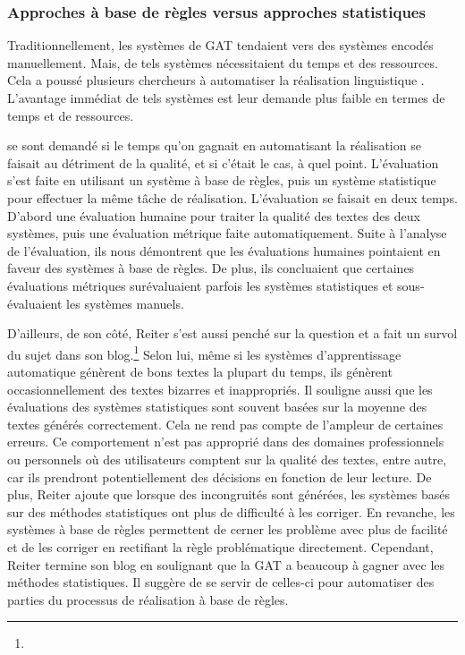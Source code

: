 \subsubsection{Approches à base de règles versus approches statistiques}


Traditionnellement, les systèmes de \ac{GAT} tendaient vers des systèmes encodés manuellement. Mais, de tels systèmes nécessitaient du temps et des ressources. Cela a poussé plusieurs chercheurs à automatiser la réalisation linguistique \citep{LangkildeForestbasedStatisticalSentence2000}. L'avantage immédiat de tels systèmes est leur demande plus faible en termes de temps et de ressources. 

\cite{BelzSystemBuildingCost2009} se sont demandé si le temps qu'on gagnait en automatisant la réalisation se faisait au détriment de la qualité, et si c'était le cas, à quel point. L'évaluation s'est faite en utilisant un système à base de règles, puis un système statistique pour effectuer la même tâche de réalisation. L'évaluation se faisait en deux temps. D'abord une évaluation humaine pour traiter la qualité des textes des deux systèmes, puis une évaluation métrique faite automatiquement. Suite à l'analyse de l'évaluation, ils nous démontrent que les évaluations humaines pointaient en faveur des systèmes à base de règles. De plus, ils concluaient que certaines évaluations métriques surévaluaient parfois les systèmes statistiques et sous-évaluaient les systèmes manuels.

D'ailleurs, de son côté, Reiter s'est aussi penché sur la question et a fait un survol du sujet dans son blog.\footnote{} Selon lui, même si les systèmes d'apprentissage automatique génèrent de bons textes la plupart du temps, ils génèrent occasionnellement des textes bizarres et inappropriés. Il souligne aussi que les évaluations des systèmes statistiques sont souvent basées sur la moyenne des textes générés correctement. Cela ne rend pas compte de l'ampleur de certaines erreurs. Ce comportement n'est pas approprié dans des domaines professionnels ou personnels où des utilisateurs comptent sur la qualité des textes, entre autre, car ils prendront potentiellement des décisions en fonction de leur lecture. De plus, Reiter ajoute que lorsque des incongruités sont générées, les systèmes basés sur des méthodes statistiques ont plus de difficulté à les corriger. En revanche, les systèmes à base de règles permettent de cerner les problème avec plus de facilité et de les corriger en rectifiant la règle problématique directement. Cependant, Reiter termine son blog en soulignant que la \ac{GAT} a beaucoup à gagner avec les méthodes statistiques. Il suggère de se servir de celles-ci pour automatiser des parties du processus de réalisation à base de règles.

